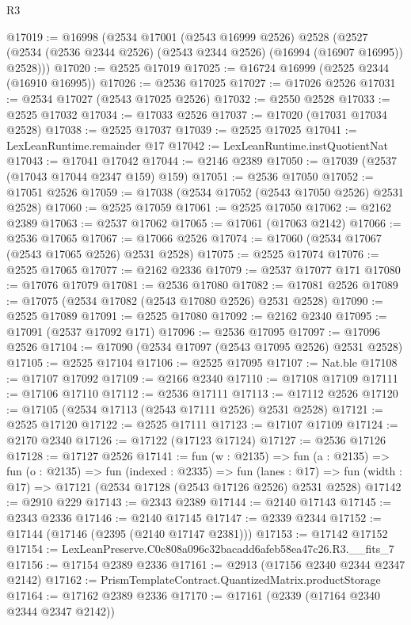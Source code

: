 \begin{lexlean}{R3}
\begin{coremodule}
@17019 := @16998
    (@2534
      @17001
      (@2543 @16999 @2526)
      @2528
      (@2527 (@2534 (@2536 @2344 @2526) (@2543 @2344 @2526) (@16994 (@16907 @16995)) @2528)))
@17020 := @2525 @17019
@17025 := @16724 @16999 (@2525 @2344 (@16910 @16995))
@17026 := @2536 @17025
@17027 := @17026 @2526
@17031 := @2534 @17027 (@2543 @17025 @2526)
@17032 := @2550 @2528
@17033 := @2525 @17032
@17034 := @17033 @2526
@17037 := @17020 (@17031 @17034 @2528)
@17038 := @2525 @17037
@17039 := @2525 @17025
@17041 := LexLeanRuntime.remainder @17
@17042 := LexLeanRuntime.instQuotientNat
@17043 := @17041 @17042
@17044 := @2146 @2389
@17050 := @17039 (@2537 (@17043 @17044 @2347 @159) @159)
@17051 := @2536 @17050
@17052 := @17051 @2526
@17059 := @17038 (@2534 @17052 (@2543 @17050 @2526) @2531 @2528)
@17060 := @2525 @17059
@17061 := @2525 @17050
@17062 := @2162 @2389
@17063 := @2537 @17062
@17065 := @17061 (@17063 @2142)
@17066 := @2536 @17065
@17067 := @17066 @2526
@17074 := @17060 (@2534 @17067 (@2543 @17065 @2526) @2531 @2528)
@17075 := @2525 @17074
@17076 := @2525 @17065
@17077 := @2162 @2336
@17079 := @2537 @17077 @171
@17080 := @17076 @17079
@17081 := @2536 @17080
@17082 := @17081 @2526
@17089 := @17075 (@2534 @17082 (@2543 @17080 @2526) @2531 @2528)
@17090 := @2525 @17089
@17091 := @2525 @17080
@17092 := @2162 @2340
@17095 := @17091 (@2537 @17092 @171)
@17096 := @2536 @17095
@17097 := @17096 @2526
@17104 := @17090 (@2534 @17097 (@2543 @17095 @2526) @2531 @2528)
@17105 := @2525 @17104
@17106 := @2525 @17095
@17107 := Nat.ble
@17108 := @17107 @17092
@17109 := @2166 @2340
@17110 := @17108 @17109
@17111 := @17106 @17110
@17112 := @2536 @17111
@17113 := @17112 @2526
@17120 := @17105 (@2534 @17113 (@2543 @17111 @2526) @2531 @2528)
@17121 := @2525 @17120
@17122 := @2525 @17111
@17123 := @17107 @17109
@17124 := @2170 @2340
@17126 := @17122 (@17123 @17124)
@17127 := @2536 @17126
@17128 := @17127 @2526
@17141 := fun (w : @2135) =>
  fun (a : @2135) =>
  fun (o : @2135) =>
  fun (indexed : @2335) =>
  fun (lanes : @17) => fun (width : @17) => @17121 (@2534 @17128 (@2543 @17126 @2526) @2531 @2528)
@17142 := @2910 @229
@17143 := @2343 @2389
@17144 := @2140 @17143
@17145 := @2343 @2336
@17146 := @2140 @17145
@17147 := @2339 @2344
@17152 := @17144 (@17146 (@2395 (@2140 @17147 @2381)))
@17153 := @17142 @17152
@17154 := LexLeanPreserve.C0c808a096c32bacadd6afeb58ea47c26.R3.__fits_7
@17156 := @17154 @2389 @2336
@17161 := @2913 (@17156 @2340 @2344 @2347 @2142)
@17162 := PrismTemplateContract.QuantizedMatrix.productStorage
@17164 := @17162 @2389 @2336
@17170 := @17161 (@2339 (@17164 @2340 @2344 @2347 @2142))

\end{coremodule}
\end{lexlean}
